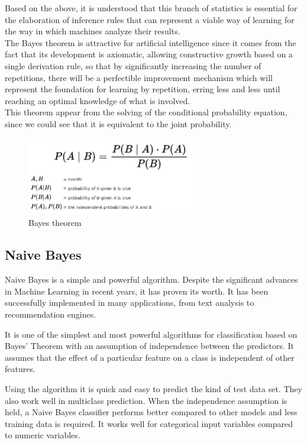 \documentclass[sigconf,12pt,review=false,natbib=false]{acmart}
\begin{document}
Based on the above, it is understood that this branch of statistics is essential for the elaboration
of inference rules that can represent a viable way of learning for the way in which machines analyze
their results. \\

The Bayes theorem is attractive for artificial intelligence since it comes from the fact that its
development is axiomatic, allowing constructive growth based on a single derivation rule, so that by
significantly increasing the number of repetitions, there will be a perfectible improvement mechanism
which will represent the foundation for learning by repetition, erring less and less until reaching
an optimal knowledge of what is involved. \\


This theorem appear from the solving of the conditional probability equation, since we could see
that it is equivalent to the joint probability. \\

\begin{figure}[h!]
    \centering
    \includegraphics[width=3in]{bayes}
    \caption{Bayes theorem}
    \label{fig:jcp_relationship}
\end{figure}

\subsection{Naive Bayes}
Naive Bayes is a simple and powerful algorithm. Despite the significant advances in Machine Learning in recent
years, it has proven its worth. It has been successfully implemented in many applications, from text analysis
to recommendation engines.

It is one of the simplest and most powerful algorithms for classification based on Bayes' Theorem with an assumption
of independence between the predictors. It assumes that the effect of a particular feature on a class is independent
of other features.

Using the algorithm it is quick and easy to predict the kind of test data set. They also work well in multiclass
prediction. When the independence assumption is held, a Naive Bayes classifier performs better compared to other
models and less training data is required.
It works well for categorical input variables compared to numeric variables.
\end{document}
